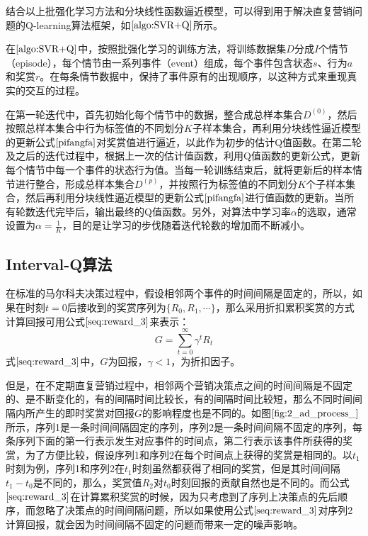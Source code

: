 结合以上批强化学习方法和分块线性函数逼近模型，可以得到用于解决直复营销问题的Q-learning算法框架，如$\ref{algo:SVR+Q}$所示。

在$\ref{algo:SVR+Q}$中，按照批强化学习的训练方法，将训练数据集$D$分成$I$个情节（episode），每个情节由一系列事件（event）组成，每个事件包含状态$s$、行为$a$和奖赏$r$。在每条情节数据中，保持了事件原有的出现顺序，以这种方式来重现真实的交互的过程。

在第一轮迭代中，首先初始化每个情节中的数据，整合成总样本集合$D^{(0)}$，然后按照总样本集合中行为标签值的不同划分$K$子样本集合，再利用分块线性逼近模型的更新公式$\eqref{pifangfa}$对奖赏值进行逼近，以此作为初步的估计Q值函数。在第二轮及之后的迭代过程中，根据上一次的估计值函数，利用Q值函数的更新公式，更新每个情节中每一个事件的状态行为值。当每一轮训练结束后，就将更新后的样本情节进行整合，形成总样本集合$D^{(p)}$，并按照行为标签值的不同划分$K$个子样本集合，然后再利用分块线性逼近模型的更新公式$\eqref{pifangfa}$进行值函数的更新。当所有轮数迭代完毕后，输出最终的Q值函数。另外，对算法中学习率$\alpha$的选取，通常设置为$\alpha=\frac{1}{K}$，目的是让学习的步伐随着迭代轮数的增加而不断减小。

\subsection{Interval-Q算法}
在标准的马尔科夫决策过程中，假设相邻两个事件的时间间隔是固定的，所以，如果在时刻$t=0$后接收到的奖赏序列为$\{R_{0}, R_{1},\cdots\}$，那么采用折扣累积奖赏的方式计算回报可用公式$\eqref{seq:reward_3}$来表示：
\begin{equation}\label{seq:reward_3}
G=\sum_{t=0}^{\infty}\gamma^{t}R_{t}
\end{equation}
式$\eqref{seq:reward_3}$中，$G$为回报，$\gamma<1$，为折扣因子。

但是，在不定期直复营销过程中，相邻两个营销决策点之间的时间间隔是不固定的、是不断变化的，有的间隔时间比较长，有的间隔时间比较短，那么不同时间间隔内所产生的即时奖赏对回报$G$的影响程度也是不同的。如图$\ref{fig:2_ad_process_}$所示，序列1是一条时间间隔固定的序列，序列2是一条时间间隔不固定的序列，每条序列下面的第一行表示发生对应事件的时间点，第二行表示该事件所获得的奖赏，为了方便比较，假设序列1和序列2在每个时间点上获得的奖赏是相同的。以$t_{1}$时刻为例，序列1和序列2在$t_{1}$时刻虽然都获得了相同的奖赏，但是其时间间隔$t_{1}-t_{0}$是不同的，那么，奖赏值$R_{2}$对$t_{0}$时刻回报的贡献自然也是不同的。而公式$\eqref{seq:reward_3}$在计算累积奖赏的时候，因为只考虑到了序列上决策点的先后顺序，而忽略了决策点的时间间隔问题，所以如果使用公式$\eqref{seq:reward_3}$对序列2计算回报，就会因为时间间隔不固定的问题而带来一定的噪声影响。

